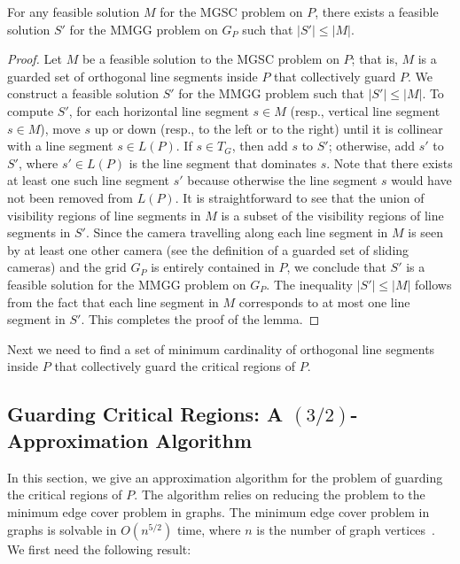 \documentclass{llncs}
\begin{document}
\begin{lemma}
\label{lem:polygonAndGP}For any feasible solution $M$ for the MGSC problem on $P$, there exists a feasible solution $S'$ for the MMGG problem on $G_P$ such that $\lvert S'\rvert\leq\lvert M\rvert$.
\end{lemma}
\begin{proof}
Let $M$ be a feasible solution to the MGSC problem on $P$; that is, $M$ is a guarded set of orthogonal line segments
inside $P$ that collectively guard $P$. We construct a feasible solution $S'$ for the MMGG problem such that
$\lvert S'\rvert\leq\lvert M\rvert$. To compute $S'$, for each horizontal line segment $s\in M$ (resp., vertical
line segment $s\in M$), move $s$ up or down (resp., to the left or to the right) until it is collinear with a line segment
$s\in L(P)$. If $s\in T_G$, then add $s$ to $S'$; otherwise, add $s'$ to $S'$, where $s'\in L(P)$ is the line segment that dominates $s$. Note that there exists at least one such line segment $s'$ because otherwise the line segment $s$ would have not been removed from $L(P)$. It is straightforward to see that the union of visibility regions of line segments in $M$ is a subset of the visibility regions of line segments in $S'$. Since the camera travelling along each line segment in $M$ is seen by at least one other camera (see the definition of a guarded set of sliding cameras) and the grid $G_P$
is entirely contained in $P$, we conclude that $S'$ is a feasible solution for the MMGG problem on $G_P$. The inequality
$\lvert S'\rvert\leq\lvert M\rvert$ follows from the fact that each line segment in $M$ corresponds to at most one line
segment in $S'$. This completes the proof of the lemma.
\end{proof}

Next we need to find a set of minimum cardinality of orthogonal line
segments inside $P$ that collectively guard the critical regions of $P$.





\subsection{Guarding Critical Regions: A \boldmath$(3/2)$-Approximation Algorithm}
\label{subsec:exactAlgorithmForCriticals}
In this section, we give an approximation algorithm for the problem of guarding the critical regions of
$P$. The algorithm relies on reducing the problem to the minimum edge cover problem in graphs. The
minimum edge cover problem in graphs is solvable in $O(n^{5/2})$ time, where $n$ is
the number of graph vertices~\cite{vazirani1980}. We first need the following result:
\end{document}
